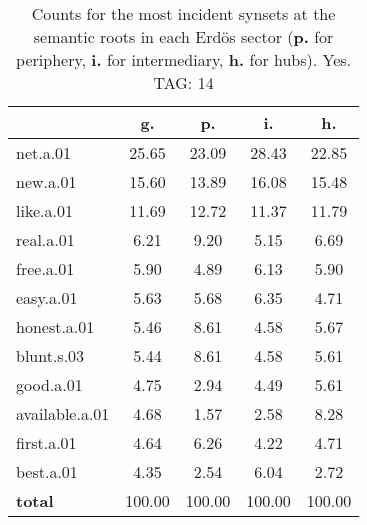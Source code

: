\begin{table}[h!]
\begin{center}
\begin{tabular}{| l | c | c | c | c |}\hline
 & g. & p. & i. & h. \\\hline
net.a.01 & 25.65  & 23.09  & 28.43  & 22.85 \\\hline
new.a.01 & 15.60  & 13.89  & 16.08  & 15.48 \\\hline
like.a.01 & 11.69  & 12.72  & 11.37  & 11.79 \\\hline
real.a.01 & 6.21  & 9.20  & 5.15  & 6.69 \\\hline
free.a.01 & 5.90  & 4.89  & 6.13  & 5.90 \\\hline
easy.a.01 & 5.63  & 5.68  & 6.35  & 4.71 \\\hline
honest.a.01 & 5.46  & 8.61  & 4.58  & 5.67 \\\hline
blunt.s.03 & 5.44  & 8.61  & 4.58  & 5.61 \\\hline
good.a.01 & 4.75  & 2.94  & 4.49  & 5.61 \\\hline
available.a.01 & 4.68  & 1.57  & 2.58  & 8.28 \\\hline
first.a.01 & 4.64  & 6.26  & 4.22  & 4.71 \\\hline
best.a.01 & 4.35  & 2.54  & 6.04  & 2.72 \\\hline
{{\bf total}} & 100.00  & 100.00  & 100.00  & 100.00 \\\hline
\end{tabular}
\caption{Counts for the most incident synsets at the semantic roots in each Erd\"os sector ({\bf p.} for periphery, {\bf i.} for intermediary, {\bf h.} for hubs). Yes. TAG: 14}
\end{center}
\end{table}
